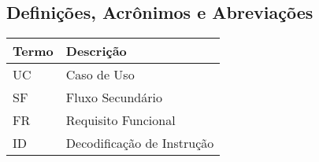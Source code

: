   \subsection{Definições, Acrônimos e Abreviações}
  \FloatBarrier
    \begin{table}[H] 
      \begin{center}
        \begin{tabular}[pos]{|m{2cm} | m{8cm}|} 
          \hline \cellcolor[gray]{0.9}\textbf{Termo} & \cellcolor[gray]{0.9}\textbf{Descrição} \\ \hline
          UC & Caso de Uso  \\ \hline
          SF & Fluxo Secundário \\ \hline
          FR & Requisito Funcional \\ \hline
          ID &  Decodificação de Instrução \\ \hline
        \end{tabular}
      \end{center}
    \label{tab:definicoes}
    \end{table}